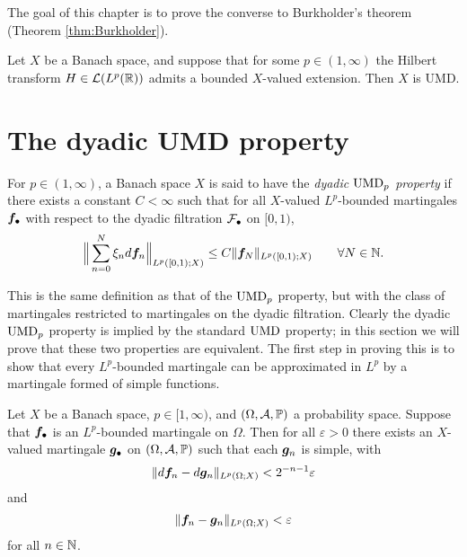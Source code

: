 The goal of this chapter is to prove the converse to Burkholder's theorem (Theorem \ref{thm:Burkholder}).

\begin{thm}[Bourgain]\label{thm:Bourgain}
  Let $X$ be a Banach space, and suppose that for some $p \in (1,\infty)$ the Hilbert transform $H \in \mathcal{L}(L^p(\mathbb{R}))$ admits a bounded $X$-valued extension.
  Then $X$ is UMD.
\end{thm}


\section{The dyadic UMD property}


\begin{defn}
  For $p \in (1,\infty)$, a Banach space $X$ is said to have the \emph{dyadic $\mathrm{UMD}_{p}$ property} if there exists a constant $C < \infty$ such that for all $X$-valued $L^p$-bounded martingales $\bm{f}_{\bullet}$ with respect to the dyadic filtration $\mathcal{F}_{\bullet}$ on $[0,1)$,
  \begin{equation}\label{eq:dyadic-UMD-property}
    \Big\| \sum_{n=0}^{N} \xi_{n} d\bm{f}_{n} \Big\|_{L^p([0,1);X)} \leq C \| \bm{f}_{N}\|_{L^p([0,1);X)} \qquad \forall N \in \mathbb{N}.
  \end{equation}
\end{defn}

This is the same definition as that of the $\mathrm{UMD}_{p}$ property, but with the class of martingales restricted to martingales on the dyadic filtration.
Clearly the dyadic $\mathrm{UMD}_{p}$ property is implied by the standard $\mathrm{UMD}$ property; in this section we will prove that these two properties are equivalent.
The first step in proving this is to show that every $L^p$-bounded martingale can be approximated in $L^p$ by a martingale formed of simple functions.

\begin{lem}\label{lem:mgale-simple-approx}
  Let $X$ be a Banach space, $p \in [1,\infty)$, and $(\Omega,\mathcal{A},\mathbb{P})$ a probability space.
  Suppose that $\bm{f}_{\bullet}$ is an $L^p$-bounded martingale on $\Omega$. 
  Then for all $\varepsilon > 0$ there exists an $X$-valued martingale $\bm{g}_{\bullet}$ on $(\Omega,\mathcal{A},\mathbb{P})$ such that each $\bm{g}_{n}$ is simple, with
  \begin{equation*}
    \|d\bm{f}_{n} - d\bm{g}_{n}\|_{L^p(\Omega;X)} < 2^{-n-1}\varepsilon
  \end{equation*}
  and
  \begin{equation*}
    \|\bm{f}_{n} - \bm{g}_{n}\|_{L^p(\Omega;X)} < \varepsilon
  \end{equation*}
  for all $n \in \mathbb{N}$.
\end{lem}

